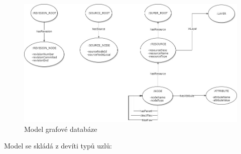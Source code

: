\begin{figure}
\begin{center}
\includegraphics[width=14cm]{figures/model}
\caption{Model grafové databáze}
\label{fig:ana-model}
\end{center}
\end{figure}

Model se skládá z devíti typů uzlů:

